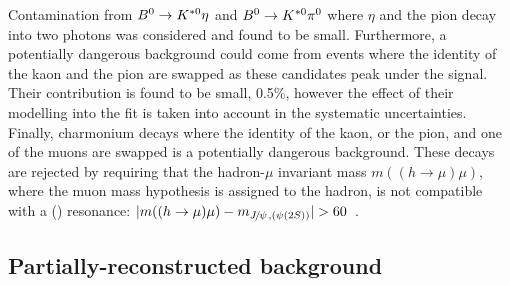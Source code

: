
Contamination from $\Bz \to\Kstarz\eta$ and $\Bz \to\Kstarz\pi^0$ where $\eta$ and the pion decay into
two photons was considered and found to be small.
Furthermore, a potentially dangerous background could come from events where the
identity of the kaon and the pion are swapped as these candidates peak under the signal.
Their contribution is found to be small, 0.5\%, however the effect of their modelling into the fit
is taken into account in the systematic uncertainties.
Finally, charmonium decays where the identity of the kaon, or the pion, and one of the muons are swapped
is a potentially dangerous background. These decays are rejected by requiring that the hadron-$\mu$ invariant
mass $m((h \to \mu)\mu)$, where the muon mass hypothesis is assigned to the hadron, is not compatible with
a \jpsi (\psitwos) resonance: $|m((h\to \mu)\mu)-m_{\jpsi, (\psitwos)} | > 60$~\mevcc.

\subsection{Partially-reconstructed background}
\label{sec:RKst_peaking_Dchains}


